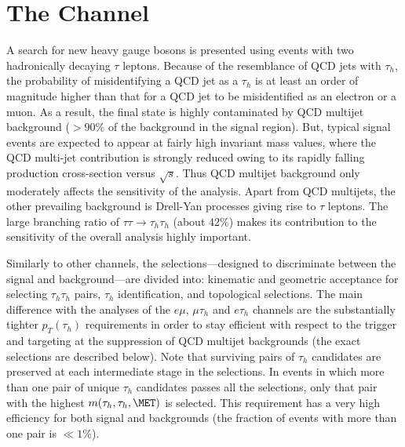 \section{The \ditauhad Channel}\label{sec:dihad}

A search for new heavy gauge bosons is presented using events with two hadronically decaying $\tau$ leptons. Because of the resemblance of QCD jets with $\tau_{h}$, the probability of misidentifying a QCD jet as a $\tau_{h}$ is at least an order of magnitude higher than that for a QCD jet to be misidentified as an electron or a muon. As a result, the final state is highly contaminated by QCD multijet background ($> 90\%$ of the background in the signal region). But, typical signal events are expected to appear at fairly high invariant mass values, where the QCD multi-jet contribution is strongly reduced owing to its rapidly falling production cross-section versus $\sqrt{s}$. Thus QCD multijet background only moderately affects the sensitivity of the analysis. Apart from QCD multijets, the other prevailing background is Drell-Yan processes giving rise to $\tau$ leptons. The large branching ratio of $\tau\tau \to \tau_{h}\tau_{h}$ (about 42\%) makes its contribution to the sensitivity of the overall analysis highly important.   

Similarly to other channels, the selections---designed to discriminate between the signal and background---are divided into: kinematic and geometric acceptance for selecting $\tau_{h}\tau_{h}$ pairs, $\tau_{h}$ identification, and topological selections. The main difference with the analyses of the $e\mu$, $\mu \tau_h$ and $e \tau_h$ channels are the substantially tighter $p_{T}(\tau_{h})$ requirements in order to stay efficient with respect to the trigger and targeting at the suppression of QCD multijet backgrounds (the exact selections are described below). Note that surviving pairs of $\tau_{h}$ candidates are preserved at each intermediate stage in the selections. In events in which more than one pair of unique $\tau_{h}$ candidates passes all the selections, only that pair with the highest $m(\tau_{h},\tau_{h},\MET)$ is selected. This requirement has a very high efficiency for both signal and backgrounds (the fraction of events with more than one pair is $\ll 1$\%).

